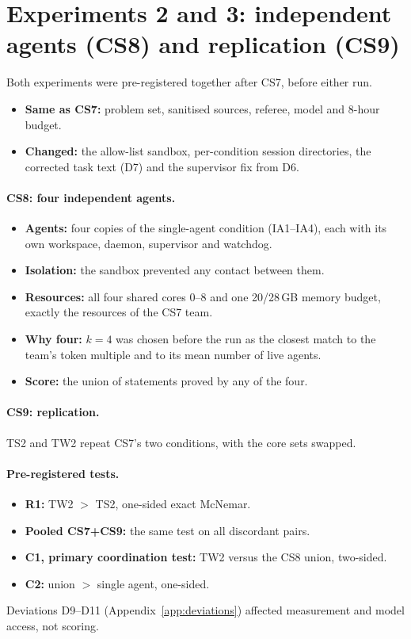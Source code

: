\documentclass[11pt]{article}
\begin{document}
\section{Experiments 2 and 3: independent agents (CS8) and replication (CS9)}
\label{sec:cs89}
Both experiments were pre-registered together after CS7, before either run.
\begin{itemize}
  \item \textbf{Same as CS7:} problem set, sanitised sources, referee, model and 8-hour budget.
  \item \textbf{Changed:} the allow-list sandbox, per-condition session directories, the corrected task text (D7) and the
    supervisor fix from D6.
\end{itemize}

\paragraph{CS8: four independent agents.}
\begin{itemize}
  \item \textbf{Agents:} four copies of the single-agent condition (IA1--IA4), each with its own workspace, daemon,
    supervisor and watchdog.
  \item \textbf{Isolation:} the sandbox prevented any contact between them.
  \item \textbf{Resources:} all four shared cores 0--8 and one 20/28\,GB memory budget, exactly the resources of the
    CS7 team.
  \item \textbf{Why four:} $k=4$ was chosen before the run as the closest match to the team's token multiple and to its
    mean number of live agents.
  \item \textbf{Score:} the union of statements proved by any of the four.
\end{itemize}

\paragraph{CS9: replication.} TS2 and TW2 repeat CS7's two conditions, with the core sets swapped.

\paragraph{Pre-registered tests.}
\begin{itemize}
  \item \textbf{R1:} TW2 $>$ TS2, one-sided exact McNemar.
  \item \textbf{Pooled CS7+CS9:} the same test on all discordant pairs.
  \item \textbf{C1, primary coordination test:} TW2 versus the CS8 union, two-sided.
  \item \textbf{C2:} union $>$ single agent, one-sided.
\end{itemize}
Deviations D9--D11 (Appendix~\ref{app:deviations}) affected measurement and model access, not scoring.
\end{document}
